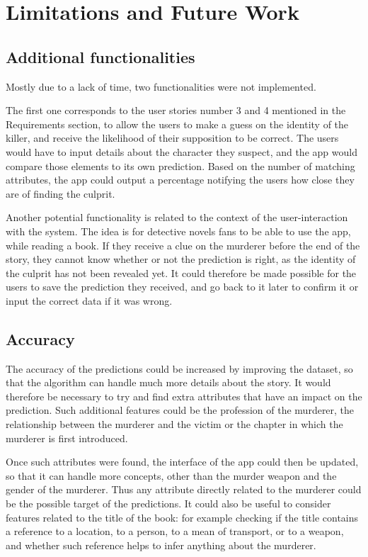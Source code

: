 \documentclass{mproj}
\begin{document}
\section{Limitations and Future Work}

\subsection*{Additional functionalities}

\hspace{5mm} Mostly due to a lack of time, two functionalities were not implemented.\par

The first one corresponds to the user stories number 3 and 4 mentioned in the Requirements section, to allow the users to make a guess on the identity of the killer, and receive the likelihood of their supposition to be correct. The users would have to input details about the character they suspect, and the app would compare those elements to its own prediction. Based on the number of matching attributes, the app could output a percentage notifying the users how close they are of finding the culprit. \par

Another potential functionality is related to the context of the user-interaction with the system. The idea is for detective novels fans to be able to use the app, while reading a book. If they receive a clue on the murderer before the end of the story, they cannot know whether or not the prediction is right, as the identity of the culprit has not been revealed yet. It could therefore be made possible for the users to save the prediction they received, and go back to it later to confirm it or input the correct data if it was wrong.

\subsection*{Accuracy}

The accuracy of the predictions could be increased by improving the dataset, so that the algorithm can handle much more details about the story. It would therefore be necessary to try and find extra attributes that have an impact on the prediction. Such additional features could be the profession of the murderer, the relationship between the murderer and the victim or the chapter in which the murderer is first introduced. \par

Once such attributes were found, the interface of the app could then be updated, so that it can handle more concepts, other than the murder weapon and the gender of the murderer. Thus any attribute directly related to the murderer could be the possible target of the predictions.
It could also be useful to consider features related to the title of the book: for example checking if the title contains a reference to a location, to a person, to a mean of transport, or to a weapon, and whether such reference helps to infer anything about the murderer.
	
\end{document}

